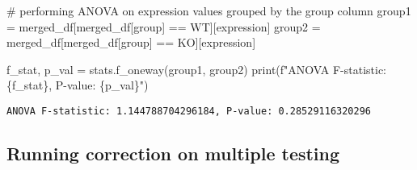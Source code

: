 \documentclass[
  letterpaper,
  DIV=11,
  numbers=noendperiod]{scrartcl}
\newenvironment{Shaded}{\begin{snugshade}}{\end{snugshade}}
\newcommand{\BuiltInTok}[1]{\textcolor[rgb]{0.00,0.23,0.31}{#1}}
\newcommand{\CommentTok}[1]{\textcolor[rgb]{0.37,0.37,0.37}{#1}}
\newcommand{\NormalTok}[1]{\textcolor[rgb]{0.00,0.23,0.31}{#1}}
\newcommand{\OperatorTok}[1]{\textcolor[rgb]{0.37,0.37,0.37}{#1}}
\newcommand{\SpecialCharTok}[1]{\textcolor[rgb]{0.37,0.37,0.37}{#1}}
\newcommand{\SpecialStringTok}[1]{\textcolor[rgb]{0.13,0.47,0.30}{#1}}
\newcommand{\StringTok}[1]{\textcolor[rgb]{0.13,0.47,0.30}{#1}}
\begin{document}
\begin{Shaded}
\begin{Highlighting}[]
\CommentTok{\# performing ANOVA on expression values grouped by the \textquotesingle{}group\textquotesingle{} column}
\NormalTok{group1 }\OperatorTok{=}\NormalTok{ merged\_df[merged\_df[}\StringTok{\textquotesingle{}group\textquotesingle{}}\NormalTok{] }\OperatorTok{==} \StringTok{\textquotesingle{}WT\textquotesingle{}}\NormalTok{][}\StringTok{\textquotesingle{}expression\textquotesingle{}}\NormalTok{]}
\NormalTok{group2 }\OperatorTok{=}\NormalTok{ merged\_df[merged\_df[}\StringTok{\textquotesingle{}group\textquotesingle{}}\NormalTok{] }\OperatorTok{==} \StringTok{\textquotesingle{}KO\textquotesingle{}}\NormalTok{][}\StringTok{\textquotesingle{}expression\textquotesingle{}}\NormalTok{]}

\NormalTok{f\_stat, p\_val }\OperatorTok{=}\NormalTok{ stats.f\_oneway(group1, group2)}
\BuiltInTok{print}\NormalTok{(}\SpecialStringTok{f"ANOVA F{-}statistic: }\SpecialCharTok{\{}\NormalTok{f\_stat}\SpecialCharTok{\}}\SpecialStringTok{, P{-}value: }\SpecialCharTok{\{}\NormalTok{p\_val}\SpecialCharTok{\}}\SpecialStringTok{"}\NormalTok{)}
\end{Highlighting}
\end{Shaded}

\begin{verbatim}
ANOVA F-statistic: 1.144788704296184, P-value: 0.28529116320296
\end{verbatim}

\subsection{Running correction on multiple
testing}\label{running-correction-on-multiple-testing}
\end{document}
